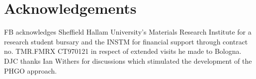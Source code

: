 \documentclass[%
reprint,
superscriptaddress,
showpacs,
 amsmath,amssymb,
 aps,
floatfix,
]{revtex4-1}
\begin{document}
\section*{Acknowledgements}

FB acknowledges Sheffield Hallam University's Materials Research Institute for a research
student bursary and the INSTM for financial support through contract no. TMR.FMRX CT970121
in respect of extended visits he made to Bologna. DJC thanks Ian Withers for discussions
which stimulated the development of the PHGO approach. %

\end{document}
